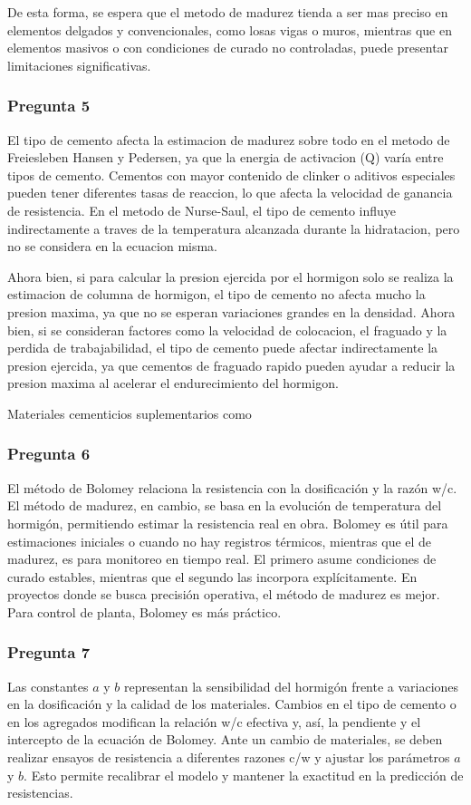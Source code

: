 De esta forma, se espera que el metodo de madurez tienda a ser mas preciso en elementos delgados y convencionales, como losas vigas o muros, mientras que en elementos masivos o con condiciones de curado no controladas, puede presentar limitaciones significativas.

\subsubsection*{Pregunta 5} 

El tipo de cemento afecta la estimacion de madurez sobre todo en el metodo de Freiesleben Hansen y Pedersen, ya que la energia de activacion (Q) varía entre tipos de cemento. Cementos con mayor contenido de clinker o aditivos especiales pueden tener diferentes tasas de reaccion, lo que afecta la velocidad de ganancia de resistencia. En el metodo de Nurse-Saul, el tipo de cemento influye indirectamente a traves de la temperatura alcanzada durante la hidratacion, pero no se considera en la ecuacion misma.

Ahora bien, si para calcular la presion ejercida por el hormigon solo se realiza la estimacion de columna de hormigon, el tipo de cemento no afecta mucho la presion maxima, ya que no se esperan variaciones grandes en la densidad. Ahora bien, si se consideran factores como la velocidad de colocacion, el fraguado y la perdida de trabajabilidad, el tipo de cemento puede afectar indirectamente la presion ejercida, ya que cementos de fraguado rapido pueden ayudar a reducir la presion maxima al acelerar el endurecimiento del hormigon.

Materiales cementicios suplementarios como

\subsubsection*{Pregunta 6} 
El método de Bolomey relaciona la resistencia con la dosificación y la razón w/c. El método de madurez, en cambio, se basa en la evolución de temperatura del hormigón, permitiendo estimar la resistencia real en obra. Bolomey es útil para estimaciones iniciales o cuando no hay registros térmicos, mientras que el de madurez, es para monitoreo en tiempo real. El primero asume condiciones de curado estables, mientras que el segundo las incorpora explícitamente. En proyectos donde se busca precisión operativa, el método de madurez es mejor. Para control de planta, Bolomey es más práctico.

\subsubsection*{Pregunta 7} 
Las constantes \( a \) y \( b \) representan la sensibilidad del hormigón frente a variaciones en la dosificación y la calidad de los materiales. Cambios en el tipo de cemento o en los agregados modifican la relación w/c efectiva y, así, la pendiente y el intercepto de la ecuación de Bolomey. Ante un cambio de materiales, se deben realizar ensayos de resistencia a diferentes razones c/w y ajustar los parámetros \( a \) y \( b \). Esto permite recalibrar el modelo y mantener la exactitud en la predicción de resistencias.


